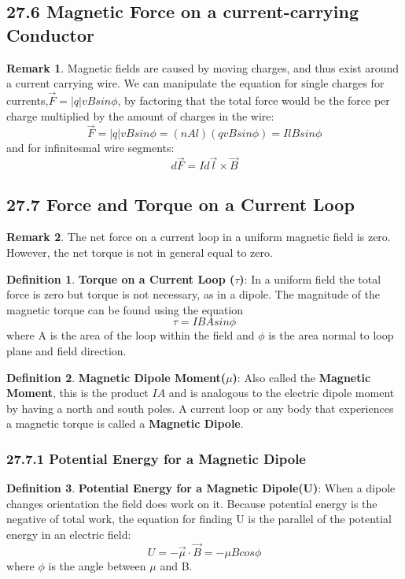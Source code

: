 \documentclass[12pt]{amsart}
\theoremstyle{definition}
\newtheorem{definition}{Definition} %
\newtheorem*{remark}{Remark}        %
\numberwithin{equation}{theorem}    %
\begin{document}
\subsection*{27.6 Magnetic Force on a current-carrying Conductor}

\begin{remark}
    Magnetic fields are caused by moving charges, and thus exist around a current
    carrying wire. We can manipulate the equation for single charges for currents,$\vec{F}=|q|vBsin\phi$, by factoring that the total force would be the force per charge multiplied by the amount of charges in the wire:
    $$\vec{F}=|q|vBsin\phi = (nAl)(qvBsin\phi) = IlBsin\phi$$ 
    and for infinitesmal wire segments: 
    $$d\vec{F} = Id\vec{l} \times \vec{B}$$
\end{remark}

\subsection*{27.7 Force and Torque on a Current Loop}
\begin{remark}
    The net force on a current loop in a uniform magnetic field is zero. However, the net torque is not in general equal to zero.
\end{remark}

\begin{definition}
    \textbf{Torque on a Current Loop ($\tau$)}:
    In a uniform field the total force is zero but torque is not necessary, as in a dipole. The magnitude of the magnetic torque can be found using the equation $$\tau = IBAsin\phi$$ where A is the area of the loop within the field and $\phi$ is the area normal to loop plane and field direction.
\end{definition}

\begin{definition}
    \textbf{Magnetic Dipole Moment($\mu$)}:
    Also called the \textbf{Magnetic Moment}, this is the product $IA$ and is analogous to the electric dipole moment by having a north and south poles. A current loop or any body that experiences a magnetic torque is called a \textbf{Magnetic Dipole}.
\end{definition}

\subsubsection*{27.7.1 Potential Energy for a Magnetic Dipole}

\begin{definition}
    \textbf{Potential Energy for a Magnetic Dipole(U)}:
    When a dipole changes orientation the field does work on it. Because potential energy is the negative of total work, the equation for finding U is the parallel of the potential energy in an electric field: 
    $$U = -\vec{\mu}\cdot \vec{B} = -\mu Bcos\phi$$
    where $\phi$ is the angle between $\mu$ and B.
\end{definition}
\end{document}
